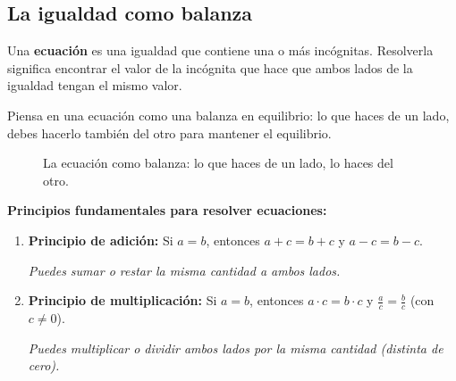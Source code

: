 \documentclass[12pt, a4paper]{article}
\begin{document}
\subsection{La igualdad como balanza}

Una \textbf{ecuación} es una igualdad que contiene una o más incógnitas. Resolverla significa encontrar el valor de la incógnita que hace que ambos lados de la igualdad tengan el mismo valor.

Piensa en una ecuación como una balanza en equilibrio: lo que haces de un lado, debes hacerlo también del otro para mantener el equilibrio.

\begin{figure}[h!]
  \centering
  \caption{La ecuación como balanza: lo que haces de un lado, lo haces del otro.}
  \label{fig:balanza}
\end{figure}

\begin{cuadroteoria}
\textbf{Principios fundamentales para resolver ecuaciones:}
\begin{enumerate}[leftmargin=*, label=\arabic*.]
  \item \textbf{Principio de adición:} Si $a = b$, entonces $a + c = b + c$ y $a - c = b - c$.
  
  \textit{Puedes sumar o restar la misma cantidad a ambos lados.}
  
  \item \textbf{Principio de multiplicación:} Si $a = b$, entonces $a \cdot c = b \cdot c$ y $\frac{a}{c} = \frac{b}{c}$ (con $c \neq 0$).
  
  \textit{Puedes multiplicar o dividir ambos lados por la misma cantidad (distinta de cero).}
\end{enumerate}
\end{cuadroteoria}
\end{document}
